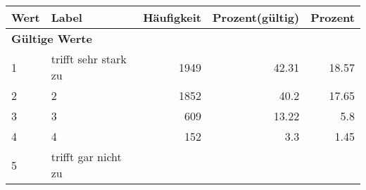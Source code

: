      \begin{longtable}{lXrrr}
     \toprule
     \textbf{Wert} & \textbf{Label} & \textbf{Häufigkeit} & \textbf{Prozent(gültig)} & \textbf{Prozent} \\
     \endhead
     \midrule
     \multicolumn{5}{l}{\textbf{Gültige Werte}}\\

     1 &
     \multicolumn{1}{X}{ trifft sehr stark zu   } &


       \num{1949} &
       \num[round-mode=places,round-precision=2]{42.31} &
         \num[round-mode=places,round-precision=2]{18.57} \\

     2 &
     \multicolumn{1}{X}{ 2   } &


       \num{1852} &
       \num[round-mode=places,round-precision=2]{40.2} &
         \num[round-mode=places,round-precision=2]{17.65} \\

     3 &
     \multicolumn{1}{X}{ 3   } &


       \num{609} &
       \num[round-mode=places,round-precision=2]{13.22} &
         \num[round-mode=places,round-precision=2]{5.8} \\

     4 &
     \multicolumn{1}{X}{ 4   } &


       \num{152} &
       \num[round-mode=places,round-precision=2]{3.3} &
         \num[round-mode=places,round-precision=2]{1.45} \\

     5 &
     \multicolumn{1}{X}{ trifft gar nicht zu   } &



\end{longtable}
